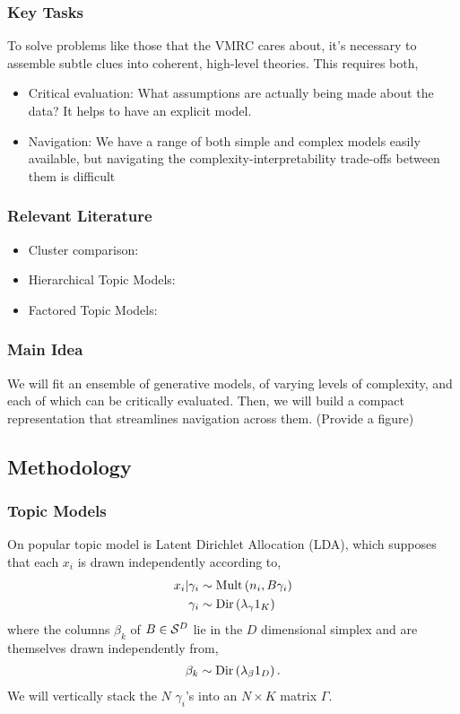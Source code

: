 \documentclass{beamer}
\begin{document}
\begin{frame}
  \frametitle{Key Tasks}
  To solve problems like those that the VMRC cares about, it's necessary to
  assemble subtle clues into coherent, high-level theories. This requires both,
  \begin{itemize}
    \item Critical evaluation: What assumptions are actually being made about
    the data? It helps to have an explicit model.
    \item Navigation: We have a range of both simple and complex models easily
    available, but navigating the complexity-interpretability trade-offs between
    them is difficult
  \end{itemize}
\end{frame}

\begin{frame}
  \frametitle{Relevant Literature}
  \begin{itemize}
    \item Cluster comparison:
    \item Hierarchical Topic Models:
    \item Factored Topic Models:
  \end{itemize}
\end{frame}

\begin{frame}
  \frametitle{Main Idea}
  We will fit an ensemble of generative models, of varying levels of complexity,
  and each of which can be critically evaluated. Then, we will build a compact
  representation that streamlines navigation across them.
  (Provide a figure)
\end{frame}

\subsection{Methodology}

\begin{frame}
  \frametitle{Topic Models}
  On popular topic model is Latent Dirichlet Allocation (LDA), which supposes
  that each $x_{i}$ is drawn independently according to,
  \begin{align*}
  x_i \vert \gamma_i &\sim \text{Mult}\left(n_{i}, B\gamma_{i}\right) \\
  \gamma_{i} &\sim \text{Dir}\left(\lambda_{\gamma} 1_{K}\right)
  \end{align*}
  where the columns $\beta_{k}$ of $B \in \mathcal{S}^{D}$ lie in the $D$
  dimensional simplex and are themselves drawn independently from,
  \begin{align}
  \beta_{k} \sim \text{Dir}\left(\lambda_{\beta} 1_{D}\right).
  \end{align}
  We will vertically stack the $N$ $\gamma_i$'s into an $N \times K$ matrix
  $\Gamma$.
\end{frame}
\end{document}
